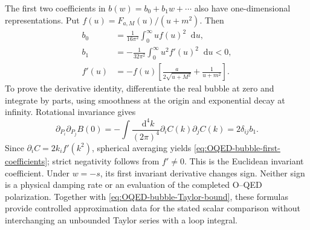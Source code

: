 \documentclass[final,5p,times,twocolumn,numbers,nopreprintline]{elsarticle}
\numberwithin{equation}{section}
\theoremstyle{definition}
\theoremstyle{remark}
\newcommand{\dd}{\mathop{}\!\mathrm d}
\begin{document}
The first two coefficients in \(b(w)=b_0+b_1w+\cdots\) also have
one-dimensional representations. Put
\(f(u)=F_{a,M}(u)/(u+m^2)\). Then
\begin{equation}
\begin{aligned}
 b_0&=\frac1{16\pi^2}\int_0^\infty u f(u)^2\dd u,\\
 b_1&=-\frac1{32\pi^2}\int_0^\infty u^2 f'(u)^2\dd u<0,\\
 f'(u)&=-f(u)\left[\frac{a}{2\sqrt{u+M^2}}+\frac1{u+m^2}\right].
\end{aligned}
 \label{eq:OQED-bubble-first-coefficients}
\end{equation}
To prove the derivative identity, differentiate the real bubble at zero
and integrate by parts, using smoothness at the origin and exponential
decay at infinity. Rotational invariance gives
\[
 \partial_{P_i}\partial_{P_j}B(0)
 =-\int\frac{\dd^4k}{(2\pi)^4}\partial_i C(k)\partial_j C(k)
 =2\delta_{ij}b_1.
\]
Since \(\partial_i C=2k_i f'(k^2)\), spherical averaging yields
\eqref{eq:OQED-bubble-first-coefficients}; strict negativity follows
from \(f'\ne0\). This is the Euclidean invariant coefficient. Under
\(w=-s\), its first invariant derivative changes sign. Neither sign
is a physical damping rate or an evaluation of the completed O--QED
polarization. Together with \eqref{eq:OQED-bubble-Taylor-bound}, these
formulas provide controlled approximation data for the stated scalar
comparison without interchanging an unbounded Taylor series with a loop
integral.
\end{document}

